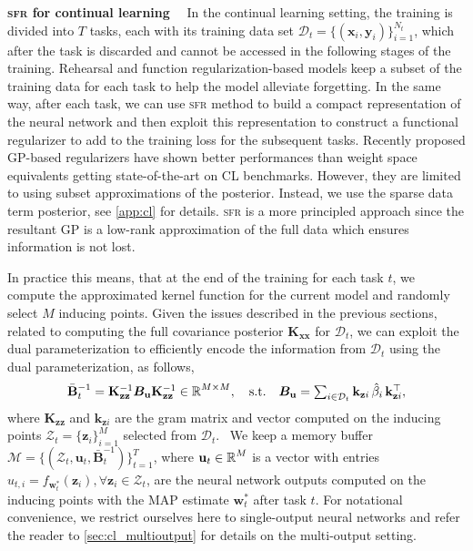 \documentclass{article}
\renewcommand{\paragraph}[1]{{\bf #1}~~}
\newcommand{\our}{\textsc{sfr}\xspace}
\newcommand{\dataset}{\ensuremath{\mathcal{D}}}
\newcommand{\weights}{\ensuremath{\mathbf{w}}}
\newcommand{\mathbold}[1]{\bm{#1}}
\newcommand{\mbf}[1]{\mathbf{#1}}
\newcommand{\MB}{\mbf{B}}
\newcommand{\MX}{\mbf{X}}
\newcommand{\T}{\top}
\newcommand{\MBeta}[0]{\mathbold{B}}
\newcommand{\vz}{\mbf{z}}
\newcommand{\vu}{\mbf{u}}
\newcommand{\vw}{\mbf{w}}
\newcommand{\MKzz}{\mbf{K}_{\mbf{z}\mbf{z}}}
\newcommand{\MKxx}{\mbf{K}_{\mbf{x}\mbf{x}}}
\newcommand{\vkzi}{\mbf{k}_{\mbf{z}i}}
\begin{document}
\paragraph{\our for continual learning}
In the continual learning setting, the training is divided into $T$ tasks, each with its training data set $\dataset_t = \{(\mathbf{x}_{i}, \mathbf{y}_{i})\}_{i=1}^{N_t}$, which after the task is discarded and cannot be accessed in the following stages of the training. Rehearsal and function regularization-based models keep a subset of the training data for each task to help the model alleviate forgetting. In the same way, after each task, we can use \our method to build a compact representation of the neural network and then exploit this representation to construct a functional regularizer to add to the training loss for the subsequent tasks. Recently proposed GP-based regularizers \cite{ pan2020continual, rudner2022continual} have shown better performances than weight space equivalents getting state-of-the-art  on CL benchmarks. However, they are limited to using subset approximations of the posterior. Instead, we use the sparse data term posterior, see \cref{app:cl} for details.
\our is a more principled approach since the resultant GP is a low-rank approximation of the full data which ensures information is not lost. %

In practice this means, that at the end of the training for each task $t$, we compute the approximated kernel function for the current model and randomly select $M$ inducing points. Given the issues described in the previous sections, related to computing the full covariance posterior $\MKxx$ for $\dataset_t$,\todo{this should be $\kappa(\MX_t, \MX_t)$} we can exploit the dual parameterization to efficiently encode the information from  $\dataset_t$ using the dual parameterization, as follows, 
%
\begin{equation}\textstyle
 	\bar{\MB}^{-1}_t = \MKzz^{-1} \MBeta_\vu \MKzz^{-1} \in \R^{M \times M}, 
 	\quad \text{s.t.} \quad
 	\MBeta_{\vu} =  \sum_{i \in \dataset_t} \vkzi \,\hat{\beta}_{i} \, \vkzi^{\T} ,    
\end{equation}
%
where $\MKzz$ and $\vkzi$ are the gram matrix and vector computed on the inducing points $\mathcal{Z}_t = \{\vz_i\}_{i=1}^M$ selected from $\dataset_t$.\
%
We keep a memory buffer $\mathcal{M} = \{(\mathcal{Z}_t, \vu_t, \bar{\MB}^{-1}_t)\}_{t=1}^T$, where $\vu_t \in \R^{M}$ is a vector with entries $u_{t, i} = f_{\vw_t^*}(\vz_i), \forall \vz_i \in \mathcal{Z}_t$, are the neural network outputs computed on the inducing points with the MAP estimate $\weights_t^*$ after task $t$. For notational convenience, we restrict ourselves here to single-output neural networks and refer the reader to \cref{sec:cl_multioutput} for details on the multi-output setting. 
\end{document}
